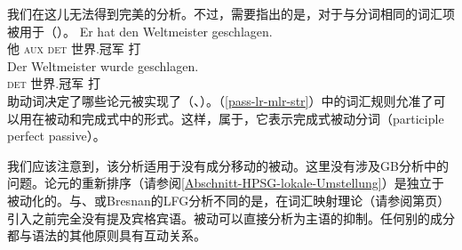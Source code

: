 我们在这儿无法得到完美的分析。不过，需要指出的是，对于与分词相同的词汇项被用于（）。
\eal
\ex 
\gll Er hat den Weltmeister geschlagen.\\
	 他 \textsc{aux} \textsc{det} 世界.冠军 打\\
\ex 
\gll Der Weltmeister wurde geschlagen.\\
	 \textsc{det} 世界.冠军 \passivepst{} 打\\
\zl
助动词决定了哪些论元被实现了（\citealp{Haider86}、\citealp[\S~17]{MuellerLehrbuch1}）。（\ref{pass-lr-mlr-str}）中的词汇规则允准了可以用在被动和完成式中的形式。这样，\vformvc 属于，它表示完成式被动分词（participle perfect passive）。

我们应该注意到，该分析适用于没有成分移动的被动。这里没有涉及GB分析中的问题\indexgbc。论元的重新排序（请参阅\ref{Abschnitt-HPSG-lokale-Umstellung}）是独立于被动化的。与\gpsgc、\cgc 或Bresnan的LFG分析\indexlfgc 不同的是，在词汇映射理论（请参阅第\pageref{page-LMT}页）引入之前完全没有提及宾格宾语。被动可以直接分析为主语的抑制。任何别的成分都与语法的其他原则具有互动关系。

